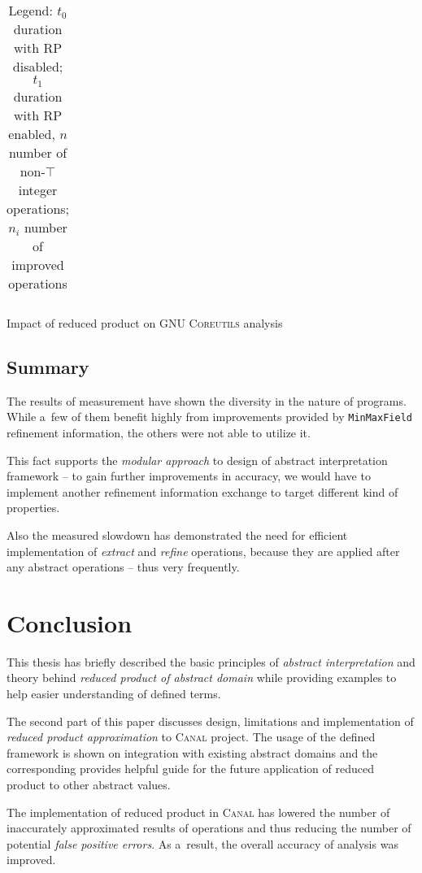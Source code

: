 \documentclass[12pt,oneside]{fithesis2}
\theoremstyle{definition}
\begin{document}
\begin{table}[ht!]
\begin{tabular}{l rrrr | rr}
  \end{tabular}
  \caption{Impact of reduced product on \textsc{GNU Coreutils} analysis}
  \caption*{\footnotesize Legend: $t_0$ duration with RP disabled; $t_1$ duration with RP enabled, $n$ number of non-$\top$ integer operations; $n_i$ number of improved operations}
\end{table}

\section{Summary}

The results of measurement have shown the diversity in the nature of programs. While a~few of them benefit highly from improvements provided by \texttt{MinMaxField} refinement information, the others were not able to utilize it.

This fact supports the \textit{modular approach} to design of abstract interpretation framework -- to gain further improvements in accuracy, we would have to implement another refinement information exchange to target different kind of properties.

Also the measured slowdown has demonstrated the need for efficient implementation of \textit{extract} and \textit{refine} operations, because they are applied after any abstract operations -- thus very frequently.

\chapter{Conclusion}

This thesis has briefly described the basic principles of \textit{abstract interpretation} and theory behind \textit{reduced product of abstract domain} while providing examples to help easier understanding of defined terms.

The second part of this paper discusses design, limitations and implementation of \textit{reduced product approximation} to \textsc{Canal} project. The usage of the defined framework is shown on integration with existing abstract domains and the corresponding provides helpful guide for the future application of reduced product to other abstract values.

The implementation of reduced product in \textsc{Canal} has lowered the number of inaccurately approximated results of operations and thus reducing the number of potential \textit{false positive errors}. As a~result, the overall accuracy of analysis was improved.
\end{document}
